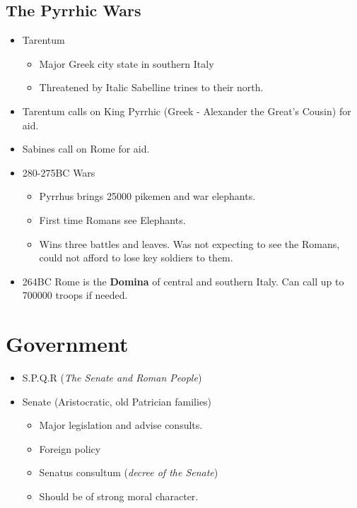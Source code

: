 \documentclass[12pt, twoside]{article}
\begin{document}
\subsection{The Pyrrhic Wars}
\begin{itemize}
\item Tarentum
	\begin{itemize}
	\item Major Greek city state in southern Italy
	\item Threatened by Italic Sabelline trines to their north. 
	\end{itemize}
\item Tarentum calls on King Pyrrhic (Greek - Alexander the Great's Cousin) for aid.
\item Sabines call on Rome for aid.
\item 280-275BC Wars
	\begin{itemize}
	\item Pyrrhus brings 25000 pikemen and war elephants.
	\item First time Romans see Elephants.
	\item Wins three battles and leaves. Was not expecting to see the Romans, could not afford to lose key soldiers to them.
	\end{itemize}
\item 264BC Rome is the \textbf{Domina} of central and southern Italy.  Can call up to 700000 troops if needed.
\end{itemize}

\section{Government}
\begin{itemize}
\item S.P.Q.R (\emph{The Senate and Roman People})
\item Senate (Aristocratic, old Patrician families)
	\begin{itemize}
	\item Major legislation and advise consults.
	\item Foreign policy
	\item Senatus consultum (\emph{decree of the Senate})
	\item Should be of strong moral character. 
	\end{itemize}
\end{itemize}
\end{document}
